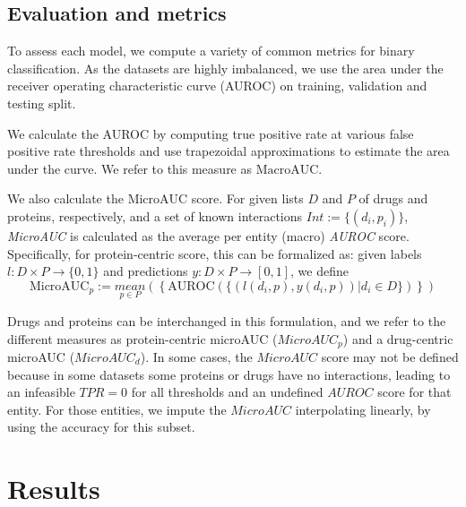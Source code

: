 \documentclass{bioinfo}
\begin{document}
\subsection{Evaluation and metrics}
\label{sec:evaluation}
To assess each model, we compute a variety of common metrics for
binary classification. As the datasets are highly imbalanced, we use
the area under the receiver operating characteristic curve
(AUROC) on training, validation and testing split. %

We calculate the AUROC by computing true positive rate at various
false positive rate thresholds and use trapezoidal approximations to
estimate the area under the curve. We refer to this measure as
$\textrm{MacroAUC}$.

We also calculate the $\textrm{MicroAUC}$ score. For given lists $D$
and $P$ of drugs and proteins, respectively, and a set of known
interactions $Int := \{(d_i, p_i) \}$, \textit{MicroAUC} is calculated
as the average per entity (macro) \textit{AUROC} score. Specifically,
for protein-centric score, this can be formalized as: given labels
$l:D\times P \rightarrow \{0,1\}$ and predictions $y:D\times P
\rightarrow [0,1]$, we define
\begin{equation*}
  \textrm{MicroAUC}_p := \underset{p\in P}{mean}\left(\left\{
      \text{AUROC}(\{ (l(d_i, p), y(d_i,p))| d_i\in D\})
    \right\}\right)
\end{equation*}

Drugs and proteins can be interchanged in this formulation, and we
refer to the different measures as protein-centric microAUC
($MicroAUC_p$) and a drug-centric microAUC ($MicroAUC_d$). In some
cases, the $MicroAUC$ score may not be defined because in some
datasets some proteins or drugs have no interactions, leading to an
infeasible $TPR=0$ for all thresholds and an undefined $AUROC$ score
for that entity. For those entities, we impute the $MicroAUC$
interpolating linearly, by using the accuracy for this
subset.



\section{Results}
\end{document}
